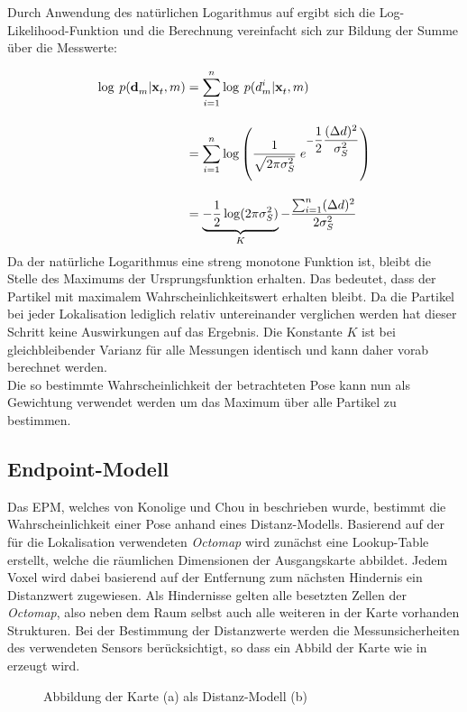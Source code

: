 Durch Anwendung des natürlichen Logarithmus auf  ergibt sich die Log-Likelihood-Funktion und die Berechnung vereinfacht sich zur Bildung der Summe über die Messwerte:

\begin{equation}
\begin{split}
\log \: p(\mathbf{d}^{}_{m}|\mathbf{x}^{}_{t},m) & = \sum_{i=1}^{n}\log\: p(d_m^i|\mathbf{x}^{}_{t},m) \\[1em]
& = \sum_{i=1}^{n}\log \left( \frac{1}{\sqrt{2\pi\sigma_S^2}} \; e^{-\dfrac{1}{2}\dfrac{{(\Delta d})^2}{\sigma_S^2}} \right)\\[1em]
& = \underbrace{-\frac{1}{2}\log(2\pi\sigma_S^2)}_K-\dfrac{\sum_{i=1}^{n}(\Delta d)^2}{2\sigma_S^2}
\end{split}
\end{equation}
Da der natürliche Logarithmus eine streng monotone Funktion ist, bleibt die Stelle des Maximums der Ursprungsfunktion erhalten. Das bedeutet, dass der Partikel mit maximalem Wahrscheinlichkeitswert erhalten bleibt. Da die Partikel bei jeder Lokalisation lediglich relativ untereinander verglichen werden hat dieser Schritt keine Auswirkungen auf das Ergebnis. Die Konstante $K$ ist bei gleichbleibender Varianz für alle Messungen identisch und kann daher vorab berechnet werden.\\
Die so bestimmte Wahrscheinlichkeit der betrachteten Pose kann nun als Gewichtung verwendet werden um das Maximum über alle Partikel zu bestimmen. 

\subsection{Endpoint-Modell}
Das EPM, welches von Konolige und Chou in \cite{Konolige1999} beschrieben wurde, bestimmt die Wahrscheinlichkeit einer Pose anhand eines Distanz-Modells. Basierend auf der für die Lokalisation verwendeten \textit{Octomap} wird zunächst eine Lookup-Table erstellt, welche die räumlichen Dimensionen der Ausgangskarte abbildet. Jedem Voxel wird dabei basierend auf der Entfernung zum nächsten Hindernis ein Distanzwert zugewiesen. Als Hindernisse gelten alle besetzten Zellen der \textit{Octomap}, also neben dem Raum selbst auch alle weiteren in der Karte vorhanden Strukturen. Bei der Bestimmung der Distanzwerte werden die Messunsicherheiten des verwendeten Sensors berücksichtigt, so dass ein Abbild der Karte wie in  erzeugt wird.

\begin{figure}[!ht]
	\begin{center}
	
	\hspace{5mm}
	\caption{Abbildung der Karte (a) als Distanz-Modell (b)}
	\label{fig.dist_map}
	\end{center}
\end{figure}

